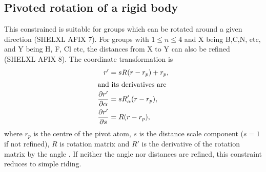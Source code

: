 \documentclass[pdf]{iucr}
\begin{document}
\subsection{Pivoted rotation of a rigid body}
\label{sec:pivoted:rotated:group}
This constrained is suitable for groups which can be rotated around a given direction (SHELXL AFIX 7). For groups  with $1\leq n \leq 4$ and X being B,C,N, etc, and Y being H, F, Cl etc, the distances from X to Y can also be refined (SHELXL AFIX 8). The coordinate transformation is
\begin{align}
r' &= sR(r-r_p) + r_{p},\\
\shortintertext{and its derivatives are}
\frac{\partial r'}{\partial \alpha} &= sR'_\alpha(r - r_p),\\ 
\frac{\partial r'}{\partial s} &= R(r-r_p),
\end{align}
where $r_p$ is the centre of the pivot atom, $s$ is the distance scale component ($s=1$ if not refined), $R$ is rotation matrix  and $R'$ is the derivative of the rotation matrix by the angle . If neither the angle nor distances are refined, this constraint reduces to simple riding.
\end{document}
